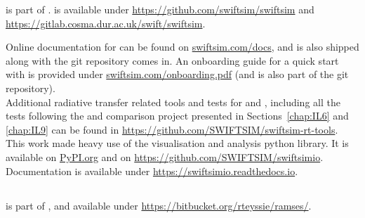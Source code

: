 \begin{small}
\GEARRT is part of \swift. \swift is available under \url{https://github.com/swiftsim/swiftsim} and 
\url{https://gitlab.cosma.dur.ac.uk/swift/swiftsim}.

Online documentation for \swift can be found on \url{swiftsim.com/docs}, and is also shipped along 
with the git repository \swift comes in. An onboarding guide for a quick start with \swift is 
provided under \url{swiftsim.com/onboarding.pdf} (and is also part of the \swift git 
repository).\\[1em]

Additional radiative transfer related tools and tests for \GEARRT and \swift, including all the 
tests following the \citet{ilievCosmologicalRadiativeTransfer2006} and 
\citet{ilievCosmologicalRadiativeTransfer2009} comparison project presented in 
Sections~\ref{chap:IL6} and \ref{chap:IL9} can be found in 
\url{https://github.com/SWIFTSIM/swiftsim-rt-tools}.\\[1em]

This work made heavy use of the  \citep{borrowSwiftsimioPythonLibrary2020} 
visualisation and analysis python library. It is available on 
\href{https://pypi.org/project/swiftsimio/}{PyPI.org} and on 
\url{https://github.com/SWIFTSIM/swiftsimio}. Documentation is available under 
\url{https://swiftsimio.readthedocs.io}.




\subsection*{\acacia}

\acacia is part of \ramses, and available under \url{https://bitbucket.org/rteyssie/ramses/}.

\end{small}
